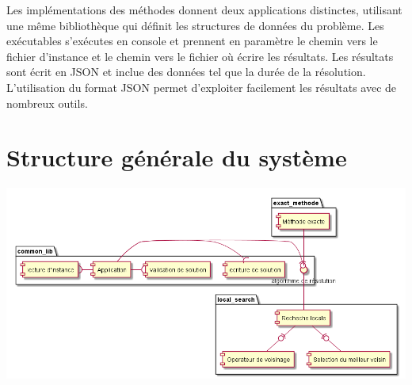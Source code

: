 Les implémentations des méthodes donnent deux applications distinctes, utilisant une même bibliothèque qui définit les structures de données du problème.
Les exécutables s'exécutes en console et prennent en paramètre le chemin vers le fichier d'instance et
le chemin vers le fichier où écrire les résultats.
Les résultats sont écrit en JSON et inclue des données tel que la durée de la résolution.
L'utilisation du format JSON permet d'exploiter facilement les résultats avec de nombreux outils.


\section{Structure générale du système}

\includegraphics[width=\textwidth]{parts/description_generale/composants}